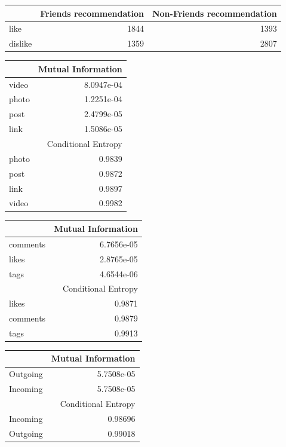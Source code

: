 \documentclass[letterpaper]{article}
\begin{document}
\begin{table}
	\begin{tabular}{| >{\small}l | >{\small}r |>{\small}r |}
		\hline
		&Friends recommendation & Non-Friends recommendation\\
		\hline
		like & 1844 & 1393 \\
		\hline
		dislike & 1359 & 2807 \\
		\hline
	\end{tabular}
\end{table}


\begin{table}
	\begin{tabular}{| >{\small}l | >{\small}r |}
		\hline
		 & Mutual Information\\
		\hline
		video & 8.0947e-04 \\
		\hline
		photo & 1.2251e-04 \\
		\hline 
		post & 2.4799e-05\\
		\hline
		link & 1.5086e-05\\
		\hline
		\hline
		& Conditional Entropy\\
		\hline
		photo & 0.9839\\
		\hline
		post & 0.9872\\
		\hline
		link & 0.9897\\
		\hline
		video & 0.9982\\
		\hline
	\end{tabular}
\end{table}

\begin{table}

	\begin{tabular}{| >{\small}l | >{\small}r |}
		\hline
		 & Mutual Information\\
		\hline
		comments & 6.7656e-05\\
		\hline
		likes & 2.8765e-05 \\
		\hline 
		tags & 4.6544e-06\\
		\hline
		\hline
		& Conditional Entropy\\
		\hline
		likes & 0.9871\\
		\hline
		comments & 0.9879\\
		\hline
		tags & 0.9913\\
		\hline
	\end{tabular}
\end{table}


\begin{table}
	\begin{tabular}{| >{\small}l | >{\small}r |}
		\hline
		 & Mutual Information\\
		\hline
		Outgoing & 5.7508e-05\\
		\hline
		Incoming &  5.7508e-05 \\
		\hline 
		\hline
		& Conditional Entropy\\
		\hline
		Incoming & 0.98696\\
		\hline
		Outgoing & 0.99018\\
		\hline
		
	\end{tabular}
\end{table}
\end{document}
